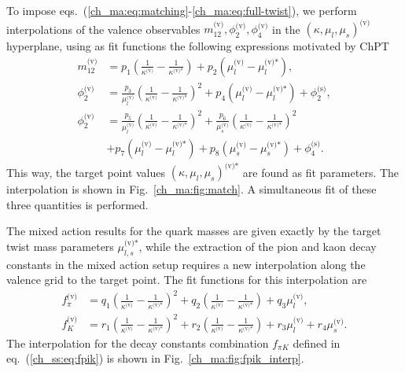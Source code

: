 To impose eqs.~(\ref{ch_ma:eq:matching}-\ref{ch_ma:eq:full-twist}), we perform interpolations of the valence observables $m_{12}^{\textrm{(v)}},\phi_2^{\textrm{(v)}},\phi_4^{\textrm{(v)}}$ in the $\left(\kappa,\mu_l,\mu_s\right)^{\textrm{(v)}}$ hyperplane, using as fit functions the following expressions motivated by ChPT
\begin{align}
m_{12}^{\textrm{(v)}}&=p_1\left(\frac{1}{\kappa^{\textrm{(v)}}}-\frac{1}{\kappa^{\textrm{(v)*}}}\right)+p_2\left(\mu_l^{\textrm{(v)}}-\mu_l^{\textrm{(v)*}}\right),\\
\phi_2^{\textrm{(v)}}&=\frac{p_3}{\mu_l^{\textrm{(v)}}}\left(\frac{1}{\kappa^{\textrm{(v)}}}-\frac{1}{\kappa^{\textrm{(v)*}}}\right)^2+p_4\left(\mu_l^{\textrm{(v)}}-\mu_l^{\textrm{(v)*}}\right)+\phi_2^{\textrm{(s)}},\\
\phi_2^{\textrm{(v)}}&=\frac{p_5}{\mu_l^{\textrm{(v)}}}\left(\frac{1}{\kappa^{\textrm{(v)}}}-\frac{1}{\kappa^{\textrm{(v)*}}}\right)^2+\frac{p_6}{\mu_s^{\textrm{(v)}}}\left(\frac{1}{\kappa^{\textrm{(v)}}}-\frac{1}{\kappa^{\textrm{(v)*}}}\right)^2 \\
&+p_7\left(\mu_l^{\textrm{(v)}}-\mu_l^{\textrm{(v)*}}\right)+p_8\left(\mu_s^{\textrm{(v)}}-\mu_s^{\textrm{(v)*}}\right)+\phi_4^{\textrm{(s)}}.
\end{align}
This way, the target point values $\left(\kappa,\mu_l,\mu_s\right)^{\textrm{(v)*}}$ are found as fit parameters. The interpolation is shown in Fig.~\ref{ch_ma:fig:match}. A simultaneous fit of these three quantities is performed.

The mixed action results for the quark masses are given exactly by the target twist mass parameters $\mu_{l,s}^{\textrm{(v)*}}$, while the extraction of the pion and kaon decay constants in the mixed action setup requires a new interpolation along the valence grid to the target point. The fit functions for this interpolation are
\begin{align}
f_{\pi}^{\textrm{(v)}}&=q_1\left(\frac{1}{\kappa^{\textrm{(v)}}}-\frac{1}{\kappa^{\textrm{(v)*}}}\right)^2+q_2\left(\frac{1}{\kappa^{\textrm{(v)}}}-\frac{1}{\kappa^{\textrm{(v)*}}}\right)+q_3\mu_l^{\textrm{(v)}},\\
f_K^{\textrm{(v)}}&=r_1\left(\frac{1}{\kappa^{\textrm{(v)}}}-\frac{1}{\kappa^{\textrm{(v)*}}}\right)^2+r_2\left(\frac{1}{\kappa^{\textrm{(v)}}}-\frac{1}{\kappa^{\textrm{(v)*}}}\right)+r_3\mu_l^{\textrm{(v)}}+r_4\mu_s^{\textrm{(v)}}.
\end{align}
The interpolation for the decay constants combination $f_{\pi K}$ defined in eq.~(\ref{ch_ss:eq:fpik}) is shown in Fig.~\ref{ch_ma:fig:fpik_interp}.


